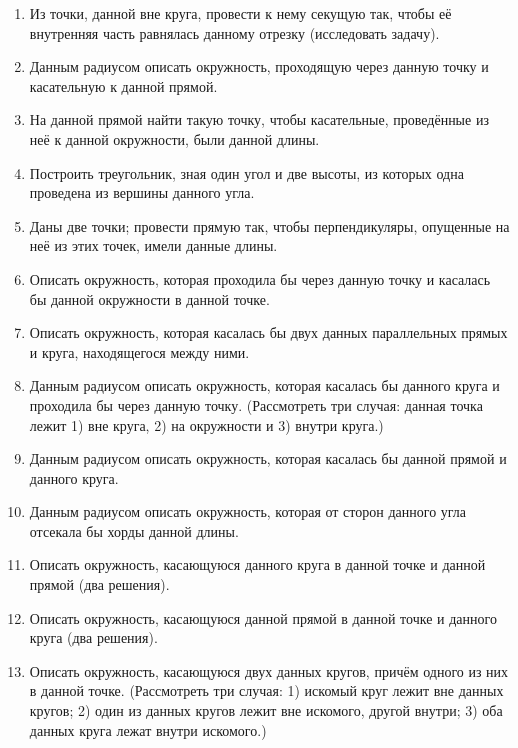 \documentclass[twoside]{book}
\begin{document}
\begin{enumerate}[resume]
 \item
Из точки, данной вне круга, провести к нему секущую так, чтобы её внутренняя часть равнялась данному отрезку (исследовать задачу).

 \item
Данным радиусом описать окружность, проходящую через данную точку и касательную к данной прямой.

 \item
На данной прямой найти такую точку, чтобы касательные, проведённые из неё к данной окружности, были данной длины.

 \item
Построить треугольник, зная один угол и две высоты, из которых одна проведена из вершины данного угла.

 \item
Даны две точки;
провести прямую так, чтобы перпендикуляры, опущенные на неё из этих точек, имели данные длины.

 \item
Описать окружность, которая проходила бы через данную точку и касалась бы данной окружности в данной точке.

 \item
Описать окружность, которая касалась бы двух данных параллельных прямых и круга, находящегося между ними.

 \item
Данным радиусом описать окружность, которая касалась бы данного круга и проходила бы через данную точку.
(Рассмотреть три случая:
данная точка лежит 
1) вне круга, 
2) на окружности 
и 3) внутри круга.)

 \item
Данным радиусом описать окружность, которая касалась бы данной прямой и данного круга.

 \item
Данным радиусом описать окружность, которая от сторон данного угла отсекала бы хорды данной длины.

 \item
Описать окружность, касающуюся данного круга в данной точке и данной прямой (два решения).

 \item
Описать окружность, касающуюся данной прямой в данной точке и данного круга (два решения).

 \item
Описать окружность, касающуюся двух данных кругов, причём одного из них в данной точке.
(Рассмотреть три случая:
1) искомый круг лежит вне данных кругов;
2) один из данных кругов лежит вне искомого, другой внутри;
3) оба данных круга лежат внутри искомого.)


\end{enumerate}
\end{document}
